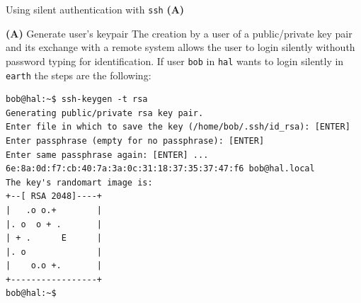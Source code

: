 \begin{frame}[t,fragile]{Using silent authentication with \alert{\texttt{ssh}} \textbf{(A)}}
  \vspace{-0.2cm}
  \begin{block}{\textbf{(A)} Generate user's keypair}
    {\footnotesize The creation by a user of a public/private key pair and its exchange
with a remote system allows the user to login silently withouth
password typing for identification. If user \texttt{bob} in \texttt{hal} wants to login silently in \texttt{earth} the steps are the following:}

{\scriptsize
  \begin{lstlisting}
bob@hal:~$ ssh-keygen -t rsa
Generating public/private rsa key pair.
Enter file in which to save the key (/home/bob/.ssh/id_rsa): [ENTER]
Enter passphrase (empty for no passphrase): [ENTER]
Enter same passphrase again: [ENTER] ...
6e:8a:0d:f7:cb:40:7a:3a:0c:31:18:37:35:37:47:f6 bob@hal.local
The key's randomart image is:
+--[ RSA 2048]----+
|   .o o.+        |
|. o  o + .       |
| + .      E      |
|. o              |
|    o.o +.       |
+-----------------+
bob@hal:~$ 
  \end{lstlisting}
}


  \end{block}
  
\end{frame}
